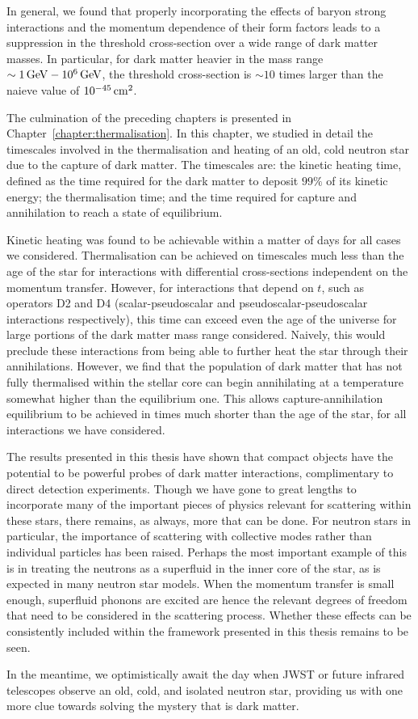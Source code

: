 In general, we found that properly incorporating the effects of baryon strong interactions and the momentum dependence of their form factors leads to a suppression in the threshold cross-section over a wide range of dark matter masses. In particular, for dark matter heavier in the mass range $\sim 1{\rm \,GeV}-10^6{\rm \,GeV}$, the threshold cross-section is $\sim 10$ times larger than the naieve value of $10^{-45}{\rm \,cm}^2$. 

The culmination of the preceding chapters is presented in Chapter~\ref{chapter:thermalisation}. In this chapter, we studied in detail the timescales involved in the thermalisation and heating of an old, cold neutron star due to the capture of dark matter. The timescales are: the kinetic heating time, defined as the time required for the dark matter to deposit $99\%$ of its kinetic energy; the thermalisation time; and the time required for capture and annihilation to reach a state of equilibrium. 

Kinetic heating was found to be achievable within a matter of days for all cases we considered. Thermalisation can be achieved on timescales much less than the age of the star for interactions with differential cross-sections independent on the momentum transfer. However, for interactions that depend on $t$, such as operators D2 and D4 (scalar-pseudoscalar and pseudoscalar-pseudoscalar interactions respectively), this time can exceed even the age of the universe for large portions of the dark matter mass range considered. Naively, this would preclude these interactions from being able to further heat the star through their annihilations. 
However, we find that the population of dark matter that has not fully thermalised within the stellar core can begin annihilating at a temperature somewhat higher than the equilibrium one. This allows capture-annihilation equilibrium to be achieved in times much shorter than the age of the star, for all interactions we have considered. 

The results presented in this thesis have shown that compact objects have the potential to be powerful probes of dark matter interactions, complimentary to direct detection experiments. Though we have gone to great lengths to incorporate many of the important pieces of physics relevant for scattering within these stars, there remains, as always, more that can be done. For neutron stars in particular, the importance of scattering with collective modes rather than individual particles has been raised. Perhaps the most important example of this is in treating the neutrons as a superfluid in the inner core of the star, as is expected in many neutron star models. When the momentum transfer is small enough, superfluid phonons are excited are hence the relevant degrees of freedom that need to be considered in the scattering process. Whether these effects can be consistently included within the framework presented in this thesis remains to be seen. 

In the meantime, we optimistically await the day when JWST or future infrared telescopes observe an old, cold, and isolated neutron star, providing us with one more clue towards solving the mystery that is dark matter.